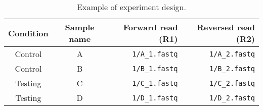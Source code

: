 \begin{table}[!htb]
    \caption[Example of experiment design]{Example of experiment design.}
    \label{tab:experiment-example}
    \centering
    \begin{threeparttable}
        \begin{tabular}{ccrr}
            \toprule
            Condition & Sample name & Forward read (R1) & Reversed read (R2) \\
            \midrule
            Control & A & \texttt{1/A\_1.fastq} & \texttt{1/A\_2.fastq} \\
            Control & B & \texttt{1/B\_1.fastq} & \texttt{1/B\_2.fastq} \\
            Testing & C & \texttt{1/C\_1.fastq} & \texttt{1/C\_2.fastq} \\
            Testing & D & \texttt{1/D\_1.fastq} & \texttt{1/D\_2.fastq} \\
            \bottomrule
        \end{tabular}
    \end{threeparttable}
\end{table}
